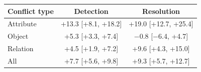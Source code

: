 \begin{tabular}{lcc}
\toprule
Conflict type & Detection & Resolution \\
\midrule
Attribute & +13.3 [+8.1, +18.2] & +19.0 [+12.7, +25.4] \\
Object & +5.3 [+3.3, +7.4] & $-$0.8 [$-$6.4, +4.7] \\
Relation & +4.5 [+1.9, +7.2] & +9.6 [+4.3, +15.0] \\
\midrule
All & +7.7 [+5.6, +9.8] & +9.3 [+5.7, +12.7] \\
\bottomrule
\end{tabular}
